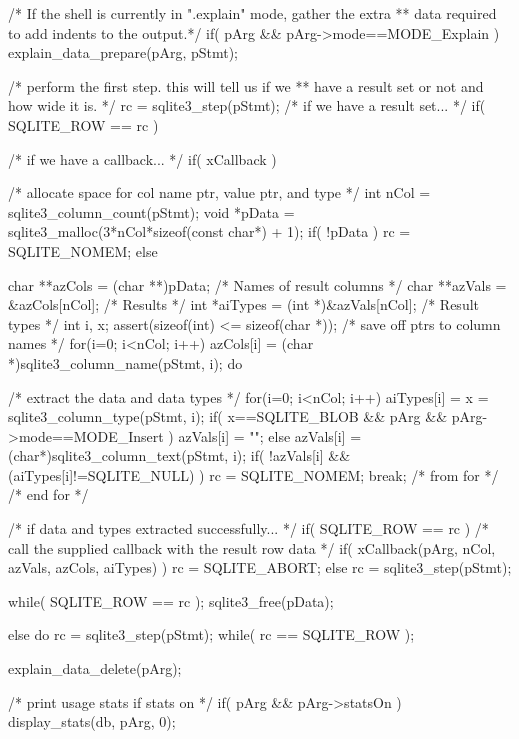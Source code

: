 \begin{Codex}[label=shell.c,numbers=left]
{{{{      /* If the shell is currently in ".explain" mode, gather the extra
      ** data required to add indents to the output.*/
      if( pArg && pArg->mode==MODE_Explain ){
        explain_data_prepare(pArg, pStmt);
      }

      /* perform the first step.  this will tell us if we
      ** have a result set or not and how wide it is.
      */
      rc = sqlite3_step(pStmt);
      /* if we have a result set... */
      if( SQLITE_ROW == rc ){
        /* if we have a callback... */
        if( xCallback ){
          /* allocate space for col name ptr, value ptr, and type */
          int nCol = sqlite3_column_count(pStmt);
          void *pData = sqlite3_malloc(3*nCol*sizeof(const char*) + 1);
          if( !pData ){
            rc = SQLITE_NOMEM;
          }else{
            char **azCols = (char **)pData;      /* Names of result columns */
            char **azVals = &azCols[nCol];       /* Results */
            int *aiTypes = (int *)&azVals[nCol]; /* Result types */
            int i, x;
            assert(sizeof(int) <= sizeof(char *)); 
            /* save off ptrs to column names */
            for(i=0; i<nCol; i++){
              azCols[i] = (char *)sqlite3_column_name(pStmt, i);
            }
            do{
              /* extract the data and data types */
              for(i=0; i<nCol; i++){
                aiTypes[i] = x = sqlite3_column_type(pStmt, i);
                if( x==SQLITE_BLOB && pArg && pArg->mode==MODE_Insert ){
                  azVals[i] = "";
                }else{
                  azVals[i] = (char*)sqlite3_column_text(pStmt, i);
                }
                if( !azVals[i] && (aiTypes[i]!=SQLITE_NULL) ){
                  rc = SQLITE_NOMEM;
                  break; /* from for */
                }
              } /* end for */

              /* if data and types extracted successfully... */
              if( SQLITE_ROW == rc ){ 
                /* call the supplied callback with the result row data */
                if( xCallback(pArg, nCol, azVals, azCols, aiTypes) ){
                  rc = SQLITE_ABORT;
                }else{
                  rc = sqlite3_step(pStmt);
                }
              }
            } while( SQLITE_ROW == rc );
            sqlite3_free(pData);
          }
        }else{
          do{
            rc = sqlite3_step(pStmt);
          } while( rc == SQLITE_ROW );
        }
      }

      explain_data_delete(pArg);

      /* print usage stats if stats on */
      if( pArg && pArg->statsOn ){
        display_stats(db, pArg, 0);
      }

}}}}
\end{Codex}
